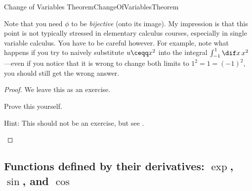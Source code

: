 \begin{thm}{Change of Variables Theorem}{ChangeOfVariablesTheorem}
\begin{rmk}
\end{rmk}
\begin{rmk}
Note that you need $\phi$ to be \emph{bijective} (onto its image).  My impression is that this point is not typically stressed in elementary calculus courses, especially in single variable calculus.  You have to be careful however.  For example, note what happens if you try to naively substitute $u\ceqq x^2$ into the integral $\int _{-1}^1\dif x\, x^2$---even if you notice that it is wrong to change both limits to $1^2=1=(-1)^2$, you should still get the wrong answer.
\end{rmk}
\begin{proof}
We leave this as an exercise.
\begin{exr}[breakable=false]{}{}
Prove this yourself.
\begin{rmk}
Hint:  This should not be an exercise, but see \cite[Theorem 6.7.1]{Sally}.
\end{rmk}
\end{exr}
\end{proof}
\end{thm}

\subsection{Functions defined by their derivatives:  \texorpdfstring{$\exp$}{exp}, \texorpdfstring{$\sin$}{sin}, and \texorpdfstring{$\cos$}{cos}}\label{sbs6.4.4}

